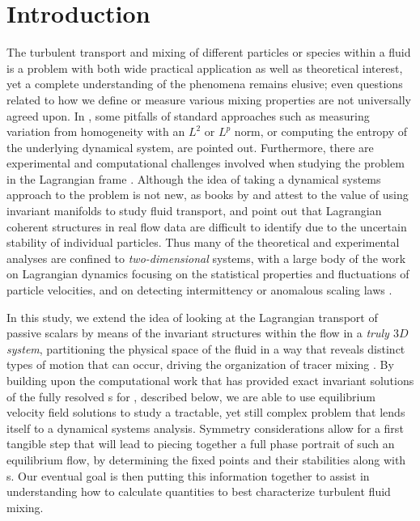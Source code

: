 

\section{Introduction}
\label{s:intro}

The turbulent transport and mixing of different particles or species 
within a fluid is a problem with both wide practical application as well 
as theoretical interest, yet a complete understanding of the phenomena 
remains elusive; even questions related to how we define or measure 
various mixing properties are not universally agreed upon. In 
\citet{MaMPe05}, some pitfalls of standard approaches such as measuring 
variation from homogeneity with an $L^2$ or $L^p$ norm, or computing the 
entropy of the underlying dynamical system, are pointed out. Furthermore, 
there are experimental and computational challenges involved when 
studying the problem in the Lagrangian frame 
\citep{MHPRS07,ABBBBB08,BrLiEc06,MoLePi04}. Although the idea of taking a 
dynamical systems approach to the problem is not new, as books by 
\citet{Botti89} and %
\citet{Wiggins1992} attest to the value of
using invariant manifolds to study fluid transport, \citet{MHPRS07} and 
\citet{Haller02} point out that Lagrangian coherent structures in 
real flow data are difficult to identify due to the uncertain stability 
of individual particles. Thus many of the theoretical and experimental 
analyses are confined to \emph{two-dimensional} systems, with a large 
body of the work on Lagrangian dynamics focusing on the statistical 
properties and fluctuations of particle velocities, and on detecting 
intermittency or anomalous scaling laws 
\citep{EgeChi22,MoLePi04,ABBBBB08,FaGaVe01}. 

In this study, we extend the idea of looking at the Lagrangian transport 
of passive scalars by means of the invariant structures within the flow 
in a \emph{truly $3D$ system}, partitioning the physical space of the 
fluid in a way that reveals distinct types of motion that can occur, 
driving the organization of tracer mixing \citep{Haller02}. By building 
upon the computational work that has provided exact invariant solutions 
of the fully resolved {\NSe}s for {\pCf}, 
described below, we are able to use equilibrium velocity field solutions 
to study a tractable, yet still complex problem that lends itself to a 
dynamical systems analysis. Symmetry considerations allow for a first 
tangible step that will lead to piecing together a full phase portrait of 
such an equilibrium flow, by determining the fixed points and their 
stabilities along with {\hc}s.  Our eventual goal is 
then putting this information together to assist in understanding how to 
calculate quantities to best characterize turbulent fluid mixing. 

